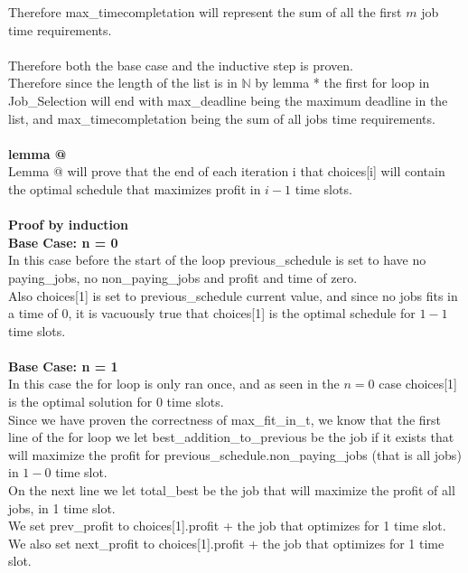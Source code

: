 \documentclass{article}
\begin{document}
        Therefore max\_timecompletation will represent the sum of all the first $m$ job time requirements.\\
        \\
        Therefore both the base case and the inductive step is proven.\\
        Therefore since the length of the list is in $\mathbb{N}$ by lemma * the first for loop in Job\_Selection will end with max\_deadline being the maximum deadline in the list, and max\_timecompletation being the sum of all jobs time requirements.\\
        \\
        \textbf{lemma @}\\
        Lemma @ will prove that the end of each iteration i that choices[i] will contain the optimal schedule that maximizes profit in $i - 1$ time slots.\\
        \\
        \textbf{Proof by induction}\\
        \textbf{Base Case: n = 0}\\
        In this case before the start of the loop previous\_schedule is set to have no paying\_jobs, no non\_paying\_jobs and profit and time of zero.\\
        Also choices[1] is set to previous\_schedule current value, and since no jobs fits in a time of 0, it is vacuously true that choices[1] is the optimal schedule for $1 - 1$ time slots.\\
        \\
        \textbf{Base Case: n = 1}\\
        In this case the for loop is only ran once, and as seen in the $n = 0$ case choices[1] is the optimal solution for 0 time slots.\\
        Since we have proven the correctness of max\_fit\_in\_t, we know that the first line of the for loop we let best\_addition\_to\_previous be the job if it exists that will maximize the profit for previous\_schedule.non\_paying\_jobs (that is all jobs) in $1 - 0$ time slot.\\
        On the next line we let total\_best be the job that will maximize the profit of all jobs, in 1 time slot.\\
        We set prev\_profit to choices[1].profit + the job that optimizes for 1 time slot.\\
        We also set next\_profit to choices[1].profit + the job that optimizes for 1 time slot.\\
\end{document}
